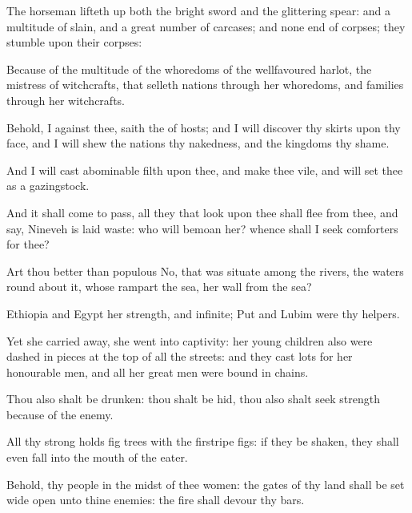 {The
horseman lifteth
up both the
bright
sword and the
glittering
spear: and
{} a
multitude of
slain, and a
great number of
carcases; and
{} none
end of
{}
corpses; they
stumble upon their
corpses:

Because of the
multitude of the
whoredoms of the
wellfavoured
harlot, the
mistress of
witchcrafts, that
selleth
nations through her
whoredoms, and
families through her
witchcrafts.

Behold, I
{} against thee,
saith the
{} of
hosts; and I will
discover thy
skirts upon thy
face, and I will
shew the
nations thy
nakedness, and the
kingdoms thy
shame.

And I will
cast abominable
filth upon thee, and make thee
vile, and will
set thee as a
gazingstock.

And it shall come to pass,
{} all they that
look upon thee shall
flee from thee, and
say,
Nineveh is laid
waste: who will
bemoan her?
whence shall I
seek
comforters for thee?


\par }{\PP {}Art thou
better than
populous
No, that was
situate among the
rivers,
{} the
waters round
about it, whose
rampart
{} the
sea,
{} her
wall
{} from the
sea?

Ethiopia and
Egypt
{} her
strength, and
{}
infinite;
Put and
Lubim were thy
helpers.

Yet
{} she carried
away, she
went into
captivity: her young
children also were dashed in
pieces at the
top of all the
streets: and they
cast
lots for her honourable
men, and all her great
men were
bound in
chains.

Thou also shalt be
drunken: thou shalt be
hid, thou also shalt
seek
strength because of the
enemy.

All thy strong
holds
{} fig
trees with the firstripe
figs: if they be
shaken, they shall even
fall into the
mouth of the
eater.

Behold, thy
people in the
midst of thee
{}
women: the
gates of thy
land shall be set
wide
open unto thine
enemies: the
fire shall
devour thy
bars.

}

